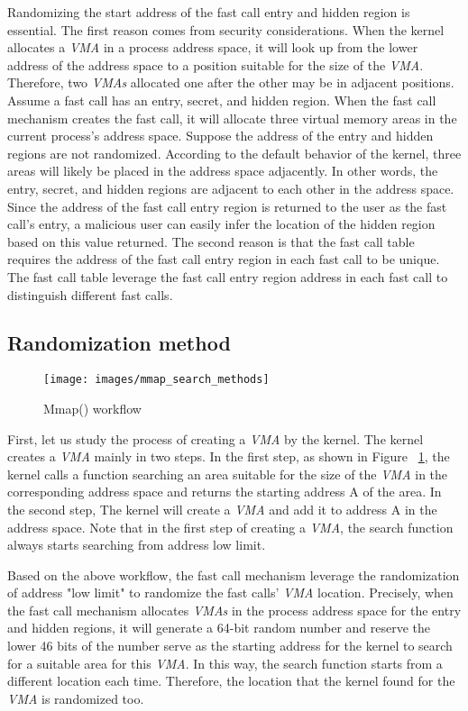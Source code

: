 Randomizing the start address of the fast call entry and hidden region is essential.
The first reason comes from security considerations. When the kernel allocates a 
\emph{VMA} in a process address space, it will look up from the lower address of the address 
space to a position suitable for the size of the \emph{VMA}. Therefore, two \emph{VMAs} 
allocated one after the other may be in adjacent positions. Assume a fast 
call has an entry, secret, and hidden region. When the fast call mechanism 
creates the fast call, it will allocate three virtual memory areas in the current 
process's address space. Suppose the address of the entry and hidden regions are 
not randomized. According to the default behavior of the kernel, three areas will 
likely be placed in the address space adjacently. In other words, the entry, secret,
and hidden regions are adjacent to each other in the address space. Since the address 
of the fast call entry region is returned to the user as the fast call's entry, 
a malicious user can easily infer the location of the hidden region based on this value returned.
The second reason is that the fast call table requires the address of the 
fast call entry region in each fast call to be unique. The fast call table 
leverage the fast call entry region address in each fast call to distinguish
different fast calls.

\subsection{Randomization method}
\begin{figure}[tbp]
  \centering
  \texttt{[image: images/mmap\_search\_methods]}
  \caption[Short description]{Mmap() workflow}
  \label{fig:mmap_search_methods}
\end{figure}

First, let us study the process of creating a \emph{VMA} by the kernel. 
The kernel creates a \emph{VMA} mainly in two steps. In the first step, as shown in Figure ~\ref{fig:mmap_search_methods}, the kernel calls 
a function searching an area suitable for the size of the \emph{VMA}  in the corresponding 
address space and returns the starting address A of the area. In the second step, 
The kernel will create a \emph{VMA} and add it to address A in the address space.  
Note that in the first step of creating a \emph{VMA}, the search 
function always starts searching from address low limit.

Based on the above workflow, the fast call mechanism leverage the randomization 
of address "low limit" to randomize the fast calls' \emph{VMA} location. Precisely,  
when the fast call mechanism allocates \emph{VMAs} in the process address space for 
the entry and hidden regions, it will generate a 64-bit random number and 
reserve the lower 46  bits of the number serve as the starting address for 
the kernel to search for a suitable area for this \emph{VMA}. In this way, the search 
function starts from a different location each time. Therefore,  the location 
that the kernel found for the \emph{VMA} is randomized too. 

